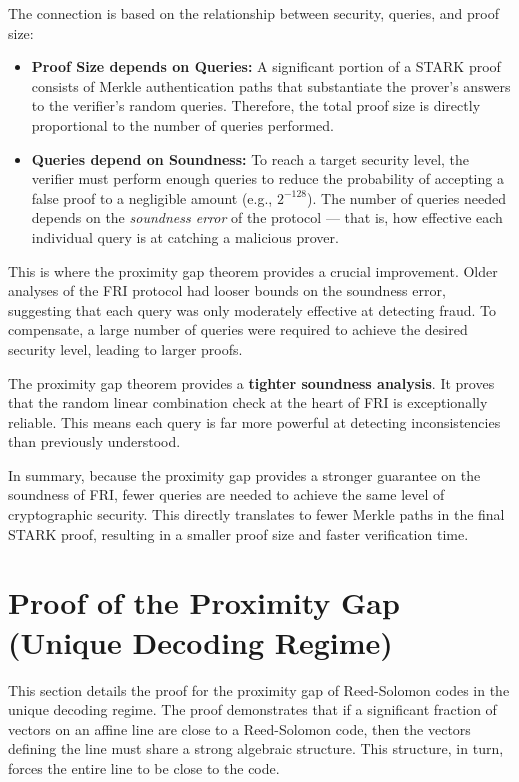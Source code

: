 \documentclass{article}
\begin{document}
The connection is based on the relationship between security, queries, and proof size:
\begin{itemize}
    \item \textbf{Proof Size depends on Queries:} A significant portion of a STARK proof consists of Merkle authentication paths that substantiate the prover's answers to the verifier's random queries. Therefore, the total proof size is directly proportional to the number of queries performed.
    \item \textbf{Queries depend on Soundness:} To reach a target security level, the verifier must perform enough queries to reduce the probability of accepting a false proof to a negligible amount (e.g., $2^{-128}$). The number of queries needed depends on the \textit{soundness error} of the protocol — that is, how effective each individual query is at catching a malicious prover.
\end{itemize}

This is where the proximity gap theorem provides a crucial improvement. Older analyses of the FRI protocol had looser bounds on the soundness error, suggesting that each query was only moderately effective at detecting fraud. To compensate, a large number of queries were required to achieve the desired security level, leading to larger proofs.

The proximity gap theorem provides a \textbf{tighter soundness analysis}. It proves that the random linear combination check at the heart of FRI is exceptionally reliable. This means each query is far more powerful at detecting inconsistencies than previously understood.

In summary, because the proximity gap provides a stronger guarantee on the soundness of FRI, fewer queries are needed to achieve the same level of cryptographic security. This directly translates to fewer Merkle paths in the final STARK proof, resulting in a smaller proof size and faster verification time.




\section{Proof of the Proximity Gap (Unique Decoding Regime)}

This section details the proof for the proximity gap of Reed-Solomon codes in the unique decoding regime. The proof demonstrates that if a significant fraction of vectors on an affine line are close to a Reed-Solomon code, then the vectors defining the line must share a strong algebraic structure. This structure, in turn, forces the entire line to be close to the code.
\end{document}
